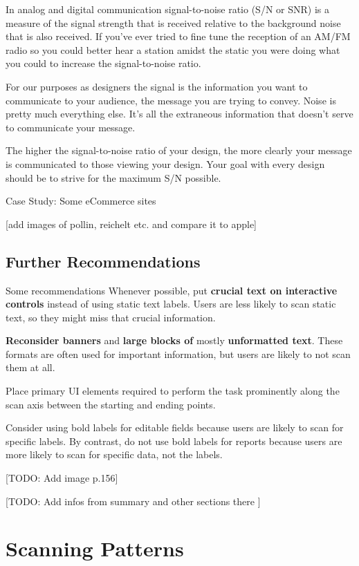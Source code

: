 In analog and digital communication signal-to-noise ratio (S/N or SNR) is a measure of the signal strength that is received relative to the background noise that is also received. If you’ve ever tried to fine tune the reception of an AM/FM radio so you could better hear a station amidst the static you were doing what you could to increase the signal-to-noise ratio.

For our purposes as designers the signal is the information you want to communicate to your audience, the message you are trying to convey. Noise is pretty much everything else. It’s all the extraneous information that doesn’t serve to communicate your message.

The higher the signal-to-noise ratio of your design, the more clearly your message is communicated to those viewing your design. Your goal with every design should be to strive for the maximum S/N possible.

Case Study: Some eCommerce sites

[add images of pollin, reichelt etc. and compare it to apple] 


\subsection{Further Recommendations} %
\label{sub:general_recommendations}

Some recommendations
Whenever possible, put \textbf{crucial text on interactive controls} instead of using static text labels. Users are less likely to scan static text, so they might miss that crucial information.

\textbf{Reconsider banners} and \textbf{large blocks of} mostly \textbf{unformatted text}. These formats are often used for important information, but users are likely to not scan them at all.

Place primary UI elements required to perform the task prominently along the scan axis between the starting and ending points.

Consider using bold labels for editable fields because users are likely to scan for specific labels. By contrast, do not use bold labels for reports because users are more likely to scan for specific data, not the labels.

[TODO: Add image p.156]

[TODO: Add infos from summary and other sections there ]


\section{Scanning Patterns} %
\label{sec:scanning_patterns}



